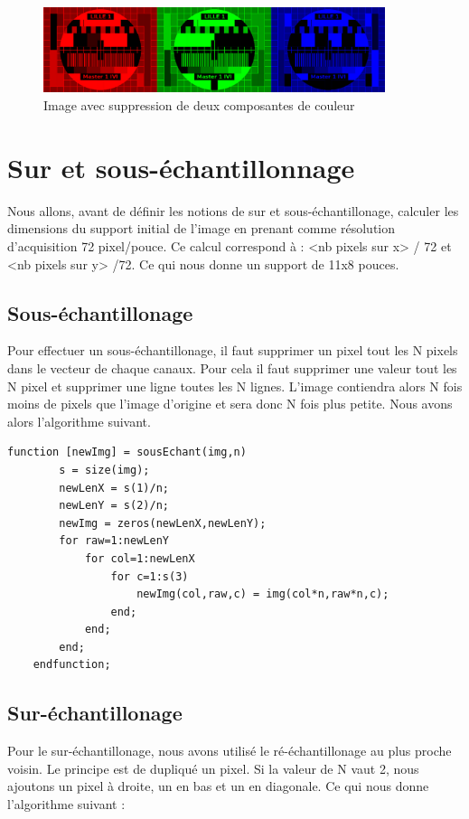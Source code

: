 \documentclass[a4paper,11pt]{article}
\begin{document}
  \begin{figure}[H]
    \center
    \includegraphics[width=10cm]{../mire_couleur.png}
    \caption{Image avec suppression de deux composantes de couleur}
  \end{figure}
  
  \section{Sur et sous-échantillonnage}
  Nous allons, avant de définir les notions de sur et sous-échantillonage, calculer les dimensions du support
  initial de l'image en prenant comme résolution d'acquisition 72 pixel/pouce. Ce calcul correspond à :
  <nb pixels sur x> / 72 et <nb pixels sur y> /72. Ce qui nous donne un support de 11x8 pouces.
  
  \subsection{Sous-échantillonage}
  Pour effectuer un sous-échantillonage, il faut supprimer un pixel tout les N pixels dans le vecteur de chaque canaux.
  Pour cela il faut supprimer une valeur tout les N pixel et supprimer une ligne toutes les N lignes. L'image contiendra
  alors N fois moins de pixels que l'image d'origine et sera donc N fois plus petite. Nous avons alors l'algorithme suivant.\\

  \begin{lstlisting}[caption=Fonction permettant le sous-échantillonnement d'une image]
    function [newImg] = sousEchant(img,n)
        s = size(img);
        newLenX = s(1)/n;
        newLenY = s(2)/n;
        newImg = zeros(newLenX,newLenY);
        for raw=1:newLenY
            for col=1:newLenX
                for c=1:s(3)
                    newImg(col,raw,c) = img(col*n,raw*n,c);
                end;
            end;
        end;
    endfunction;
  \end{lstlisting}
  
  \subsection{Sur-échantillonage}
  Pour le sur-échantillonage, nous avons utilisé le ré-échantillonage au plus proche voisin. Le principe
  est de dupliqué un pixel. Si la valeur de N vaut 2, nous ajoutons un pixel à droite, un en bas et un en diagonale.
  Ce qui nous donne l'algorithme suivant :\\
  
\end{document}

